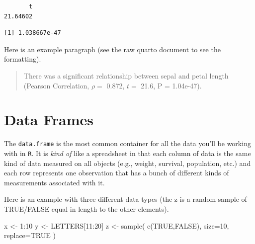 \documentclass[
  letterpaper,
]{book}
\newenvironment{Shaded}{\begin{snugshade}}{\end{snugshade}}
\newcommand{\AttributeTok}[1]{\textcolor[rgb]{0.40,0.45,0.13}{#1}}
\newcommand{\ConstantTok}[1]{\textcolor[rgb]{0.56,0.35,0.01}{#1}}
\newcommand{\DecValTok}[1]{\textcolor[rgb]{0.68,0.00,0.00}{#1}}
\newcommand{\FunctionTok}[1]{\textcolor[rgb]{0.28,0.35,0.67}{#1}}
\newcommand{\NormalTok}[1]{\textcolor[rgb]{0.00,0.23,0.31}{#1}}
\newcommand{\OtherTok}[1]{\textcolor[rgb]{0.00,0.23,0.31}{#1}}
\newcommand{\SpecialCharTok}[1]{\textcolor[rgb]{0.37,0.37,0.37}{#1}}
\begin{document}
\begin{verbatim}
       t 
21.64602 
\end{verbatim}

\begin{Shaded}
\end{Shaded}

\begin{verbatim}
[1] 1.038667e-47
\end{verbatim}

Here is an example paragraph (see the raw quarto document to see the
formatting).

\begin{quote}
There was a significant relationship between sepal and petal length
(Pearson Correlation, \(\rho =\) 0.872, \(t =\) 21.6, P = 1.04e-47).
\end{quote}

\section{Data Frames}\label{data-frames}

The \texttt{data.frame} is the most common container for all the data
you'll be working with in \texttt{R}. It is \emph{kind of} like a
spreadsheet in that each column of data is the same kind of data
measured on all objects (e.g., weight, survival, population, etc.) and
each row represents one observation that has a bunch of different kinds
of measurements associated with it.

Here is an example with three different data types (the z is a random
sample of TRUE/FALSE equal in length to the other elements).

\begin{Shaded}
\begin{Highlighting}[]
\NormalTok{x }\OtherTok{\textless{}{-}} \DecValTok{1}\SpecialCharTok{:}\DecValTok{10}
\NormalTok{y }\OtherTok{\textless{}{-}}\NormalTok{ LETTERS[}\DecValTok{11}\SpecialCharTok{:}\DecValTok{20}\NormalTok{]}
\NormalTok{z }\OtherTok{\textless{}{-}} \FunctionTok{sample}\NormalTok{( }\FunctionTok{c}\NormalTok{(}\ConstantTok{TRUE}\NormalTok{,}\ConstantTok{FALSE}\NormalTok{), }\AttributeTok{size=}\DecValTok{10}\NormalTok{, }\AttributeTok{replace=}\ConstantTok{TRUE}\NormalTok{ )}
\end{Highlighting}
\end{Shaded}
\end{document}
